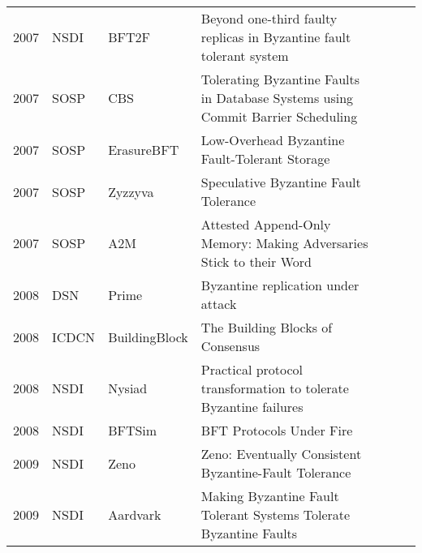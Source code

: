 \documentclass{article}
\begin{document}
\begin{landscape}
\begin{longtable}[c]{llll|l|l|l|}
2007 & NSDI              & BFT2F                   & Beyond one-third faulty replicas in Byzantine fault tolerant system                       &            &          &              \\ \cline{5-7} 
2007 & SOSP              & CBS                     & Tolerating Byzantine Faults in Database Systems using Commit Barrier Scheduling           &            &          &              \\ \cline{5-7} 
2007 & SOSP              & ErasureBFT              & Low-Overhead Byzantine Fault-Tolerant Storage                                             &            &          &              \\ \cline{5-7} 
2007 & SOSP              & Zyzzyva                 & Speculative Byzantine Fault Tolerance                                                     &            &          &              \\ \cline{5-7} 
2007 & SOSP              & A2M                     & Attested Append-Only Memory: Making Adversaries Stick to their Word                       &            &          &              \\ \cline{5-7} 
2008 & DSN               & Prime                   & Byzantine replication under attack                                                        &            &          &              \\ \cline{5-7} 
2008 & ICDCN             & BuildingBlock           & The Building Blocks of Consensus                                                          &            &          &              \\ \cline{5-7} 
2008 & NSDI              & Nysiad                  & Practical protocol transformation to tolerate Byzantine failures                          &            &          &              \\ \cline{5-7} 
2008 & NSDI              & BFTSim                  & BFT Protocols Under Fire                                                                  &            &          &              \\ \cline{5-7} 
2009 & NSDI              & Zeno                    & Zeno: Eventually Consistent Byzantine-Fault Tolerance                                     &            &          &              \\ \cline{5-7} 
2009 & NSDI              & Aardvark                & Making Byzantine Fault Tolerant Systems Tolerate Byzantine Faults                         &            &          &              \\ \cline{5-7} 

\end{longtable}
\end{landscape}
\end{document}
